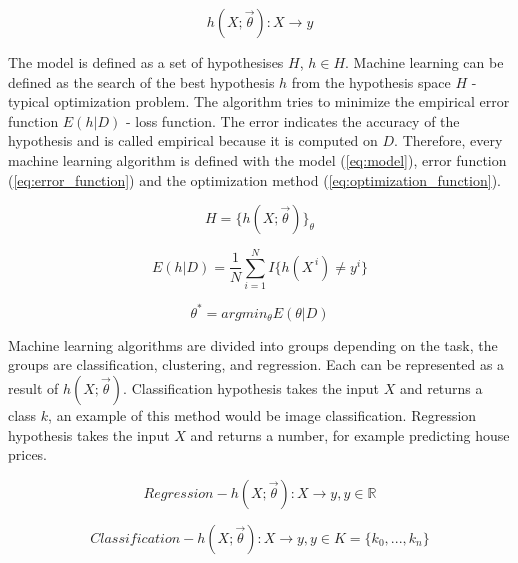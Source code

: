 \documentclass[times, utf8, diplomski]{fer}
\begin{document}
\begin{equation} \label{eq:hypotesis}
    h(X ; \vec{\theta}) : X \to y
\end{equation}


The model is defined as a set of hypothesises $H$, $h \in H$. Machine learning can be defined as the search of the best hypothesis $h$ from the hypothesis space $H$ - typical optimization problem. The algorithm tries to minimize the empirical error function $E(h|D)$ - loss function. The error indicates the accuracy of the hypothesis and is called empirical because it is computed on $D$. Therefore, every machine learning algorithm is defined with the model (\ref{eq:model}), error function (\ref{eq:error_function}) and the optimization method (\ref{eq:optimization_function}).

\begin{equation} \label{eq:model}
    H = \{ h(X ; \vec{\theta}) \}_{\theta}
\end{equation}

\begin{equation} \label{eq:error_function}
    E(h|D) =  \frac{1}{N} \displaystyle\sum_{i=1}^{N} I\{h(X^{\,i}) \neq y^{i}\}
\end{equation}

\begin{equation} \label{eq:optimization_function}
    \theta^{*} = argmin_{\theta} E(\theta | D)
\end{equation}


Machine learning algorithms are divided into groups depending on the task, the groups are classification, clustering, and regression. Each can be represented as a result of $h(X ; \vec{\theta})$. Classification hypothesis takes the input $X$ and returns a class $k$, an example of this method would be image classification. Regression hypothesis takes the input $X$ and returns a number, for example predicting house prices.

\begin{equation} \label{eq:regression_def}
    Regression - h(X ; \vec{\theta}) : X \to y, y \in \mathbb{R}
\end{equation}

\begin{equation} \label{eq:classification_def}
    Classification  - h(X ; \vec{\theta}) : X \to y, y \in K = \{k_{0}, ..., k_{n}\}
\end{equation}
\end{document}
